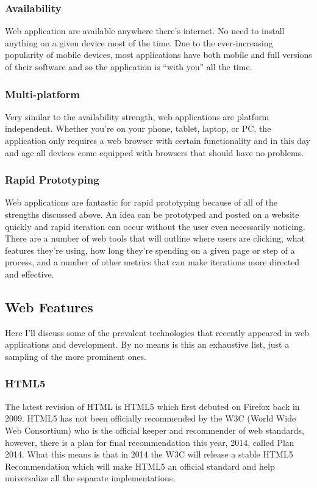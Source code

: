 \documentclass[11pt]{article}
\begin{document}
\subsubsection{Availability}
Web application are available anywhere there's internet. No need to install anything on a given device most of the time. Due to the ever-increasing popularity of mobile devices, most applications have both mobile and full versions of their software and so the application is ``with you'' all the time.

\subsubsection{Multi-platform}
Very similar to the availability strength, web applications are platform independent. Whether you're on your phone, tablet, laptop, or PC, the application only requires a web browser with certain functionality and in this day and age all devices come equipped with browsers that should have no problems.

\subsubsection{Rapid Prototyping}
Web applications are fantastic for rapid prototyping because of all of the strengths discussed above. An idea can be prototyped and posted on a website quickly and rapid iteration can occur without the user even necessarily noticing. There are a number of web tools that will outline where users are clicking, what features they're using, how long they're spending on a given page or step of a process, and a number of other metrics that can make iterations more directed and effective.


\subsection{Web Features}
Here I'll discuss some of the prevalent technologies that recently appeared in web applications and development. By no means is this an exhaustive list, just a sampling of the more prominent ones.

\subsubsection{HTML5}
The latest revision of HTML is HTML5 which first debuted on Firefox back in 2009. \cite{EvolutionOfWeb} HTML5 has not been officially recommended by the W3C (World Wide Web Consortium) who is the official keeper and recommender of web standards, however, there is a plan for final recommendation this year, 2014, called Plan 2014. \cite{Plan2014} What this means is that in 2014 the W3C will release a stable HTML5 Recommendation which will make HTML5 an official standard and help universalize all the separate implementations.
\end{document}
